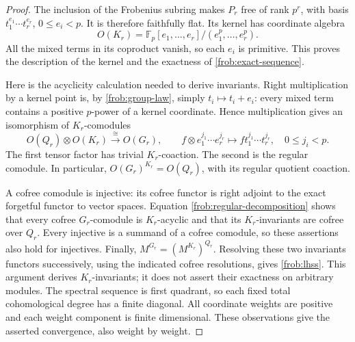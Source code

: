 \begin{proof}
The inclusion of the Frobenius subring makes $P_r$ free of rank $p^r$,
with basis $t_1^{e_1}\cdots t_r^{e_r}$, $0\leq e_i<p$.
It is therefore faithfully flat.  Its kernel has coordinate algebra
\[
 O(K_r)=\mathbb F_p[e_1,\ldots,e_r]/(e_1^p,\ldots,e_r^p).
\]
All the mixed terms in its coproduct vanish, so each $e_i$ is primitive.
This proves the description of the kernel and the exactness of
\eqref{frob:exact-sequence}.

Here is the acyclicity calculation needed to derive invariants.
Right multiplication by a kernel point is, by
\eqref{frob:group-law}, simply $t_i\mapsto t_i+e_i$: every mixed
term contains a positive $p$-power of a kernel coordinate.  Hence
multiplication gives an isomorphism of $K_r$-comodules
\begin{equation}\label{frob:regular-decomposition}
 O(Q_r)\otimes O(K_r)\xrightarrow{\ \cong\ }O(G_r),
 \qquad
 f\otimes e_1^{j_1}\cdots e_r^{j_r}
 \longmapsto f t_1^{j_1}\cdots t_r^{j_r},
 \quad 0\leq j_i<p.
\end{equation}
The first tensor factor has trivial $K_r$-coaction.  The second is the
regular comodule.  In particular,
$O(G_r)^{K_r}=O(Q_r)$, with its regular quotient coaction.

A cofree comodule is injective: its cofree functor is right adjoint to
the exact forgetful functor to vector spaces.  Equation
\eqref{frob:regular-decomposition} shows that every cofree
$G_r$-comodule is $K_r$-acyclic and that its $K_r$-invariants are
cofree over $Q_r$.  Every injective is a summand of a cofree comodule,
so these assertions also hold for injectives.  Finally,
$M^{G_r}=(M^{K_r})^{Q_r}$.  Resolving these two invariants functors
successively, using the indicated cofree resolutions, gives
\eqref{frob:lhss}.  This argument derives $K_r$-invariants; it does
not assert their exactness on arbitrary modules.  The spectral
sequence is first quadrant, so each fixed total cohomological degree
has a finite diagonal.  All coordinate weights are positive and each
weight component is finite dimensional.  These observations give the
asserted convergence, also weight by weight.
\end{proof}


